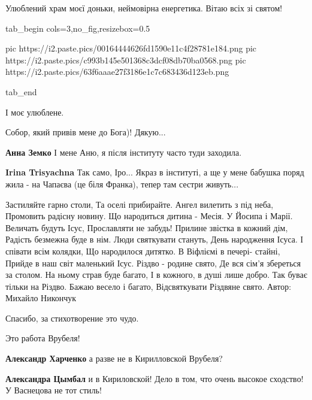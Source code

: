 \begin{itemize}
\begin{itemize}
Улюблений храм моєї доньки, неймовірна енергетика. Вітаю всіх зі святом!


\ifcmt
  tab_begin cols=3,no_fig,resizebox=0.5

     pic https://i2.paste.pics/00164444626fd1590e11c4f28781e184.png
     pic https://i2.paste.pics/c993b145e501368c3dcf08db70ba0568.png
     pic https://i2.paste.pics/63f6aaae27f3186e1c7c683436d123eb.png

  tab_end
\fi

\end{itemize} %

І моє улюблене.


Собор, який привів мене до Бога)! Дякую...

\begin{itemize} %
\textbf{Анна Земко} І мене Аню, я після інституту часто туди заходила.

\textbf{Irina Trisyachna} Так само, Іро... Якраз в інституті, а ще у мене бабушка поряд жила - на Чапаєва (це біля Франка), тепер там сестри живуть...
\end{itemize} %


\obeycr
Застиляйте гарно столи,
Та оселі прибирайте.
Ангел вилетить з під неба,
Промовить радісну новину.
\smallskip
Що народиться дитина - Месія.
У Йосипа і Марії.
Величать будуть Ісус,
Прославляти не забудь!
\smallskip
Прилине звістка в кожний дім,
Радість безмежна буде в нім.
Люди святкувати стануть,
День народження Ісуса.
\smallskip
І співати всім колядки,
Що народилося дитятко.
В Віфліємі в печері- стайні,
Прийде в наш світ маленький Ісус.
\smallskip
Різдво - родине свято,
Де вся сім'я збереться за столом.
На ньому страв буде багато,
І в кожного, в душі лише добро.
\smallskip
Так буває тільки на Різдво.
Бажаю весело і багато,
Відсвяткувати Різдвяне свято.
\smallskip
Автор: Михайло Никончук
\restorecr


Спасибо, за стихотворение это чудо.

Это работа Врубеля!

\begin{itemize} %
\textbf{Александр Харченко} а разве не в Кирилловской Врубеля?

\textbf{Александра Цымбал} и в Кириловской! Дело в том, что очень высокое сходство! У Васнецова не тот стиль!


\end{itemize}
\end{itemize}
